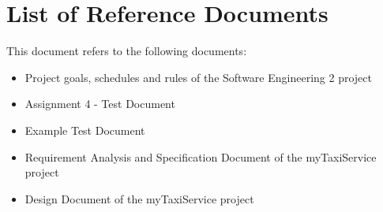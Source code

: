 \section{List of Reference Documents}
\label{sec:reference}

This document refers to the following documents:
\begin{itemize}
    \item Project goals, schedules and rules of the Software Engineering 2 project~\cite{se-project-rules}
    \item Assignment 4 - Test Document~\cite{se-assignment}
    \item Example Test Document~\cite{spingrid-integration-plan}
    \item Requirement Analysis and Specification Document of the myTaxiService project~\cite{mytaxi-rasd}
    \item Design Document of the myTaxiService project~\cite{mytaxi-dd}
\end{itemize}
